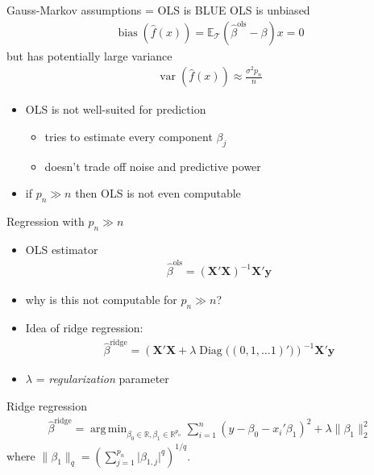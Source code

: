 \documentclass[xcolor=dvipsnames]{beamer}
\newcommand{\E}{\mathbb{E}}
\DeclareMathOperator{\bias}{bias}
\DeclareMathOperator{\var}{var}
\DeclareMathOperator{\diag}{Diag}
\DeclareMathOperator{\argmin}{arg\,min}
\begin{document}
\begin{frame}{Gauss-Markov assumptions = OLS is BLUE}
OLS is unbiased 
\begin{align*}
  \bias \left(\hat{f}(x) \right) = \E_{\mathcal{T}} \left(\hat{\beta}^{\text{ols}} - \beta \right) x = 0
\end{align*}
but has potentially large variance
\begin{align*}
  \var \left(\hat{f} (x) \right) \approx \frac{\sigma^2 p_n}{n}
\end{align*}
\begin{itemize}[<+->]
  \item OLS is not well-suited for prediction
  \begin{itemize}
    \item
    tries to estimate every component $\beta_j$
    \item 
    doesn't trade off noise and predictive power
  \end{itemize}
  \item if $p_n \gg n$ then OLS is not even computable
\end{itemize}
\end{frame}


\begin{frame}{Regression with $p_n \gg n$}
\begin{itemize}[<+->]
  \item OLS estimator
  \begin{align*}
    \hat{\beta}^{\text{ols}} = \left(\mathbf{X}'\mathbf{X}\right)^{-1} \mathbf{X}' \mathbf{y}
  \end{align*}
  \item why is this not computable for $p_n \gg n$?
  \pause
  \item Idea of ridge regression:
  \begin{align*}
    \hat{\beta}^{\text{ridge}} = \left(\mathbf{X}'\mathbf{X} + \lambda \diag\big((0, 1, \dotsc 1)'\big) \right)^{-1} \mathbf{X}' \mathbf{y}
  \end{align*}
  \item $\lambda$ = \emph{regularization} parameter
\end{itemize}
\end{frame}


\begin{frame}{Ridge regression}
\begin{align*}
  \hat{\beta}^{\text{ridge}} = \argmin_{\beta_0 \in \mathbb{R}, \beta_1 \in \mathbb{R}^{p_n}} \sum_{i=1}^n \left(y - \beta_0 - x_i'\beta_1\right)^2 + \lambda \lVert \beta_1 \rVert_2^2 
\end{align*}
where $\lVert \beta_1 \rVert_q = \left(\sum_{j=1}^{p_n} \lvert \beta_{1, j} \rvert^q \right)^{1/q}$.
\end{frame}
\end{document}
